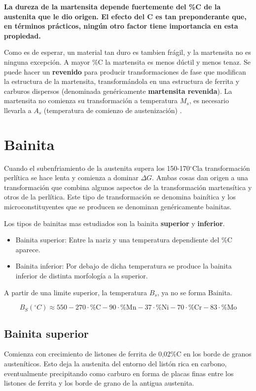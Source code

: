 \documentclass{article}
\newcommand{\grad}{\ensuremath{^\circ \mathrm{C}}}
\begin{document}
\textbf{La dureza de la martensita depende fuertemente del \%C de la austenita que le dio origen. El efecto del C es tan preponderante que, en términos prácticos, ningún otro factor tiene importancia en esta propiedad.}

Como es de esperar, un material tan duro es tambien frágil, y la martensita no es ninguna excepción. A mayor \%C la martensita es menos dúctil y menos tenaz. Se puede hacer un \textbf{revenido} para producir transformaciones de fase que modifican la estructura de la martensita, transformándola en una estructura de ferrita y carburos dispersos (denominada genéricamente \textbf{martensita revenida}). La martensita no comienza su transformación a temperatura $M_s$, es necesario llevarla a $A_s$ (temperatura de comienzo de austenización) \cite{gottstein2013physical}.

\section{Bainita}

Cuando el subenfriamiento de la austenita supera los 150-170\grad la transformación perlítica se hace lenta y comienza a dominar $\Delta G$. Ambas cosas dan origen a una transformación que combina algunos aspectos de la transformación martensítica y otros de la perlítica. Este tipo de transformación se denomina bainítica y los microconstituyentes que se producen se denominan genéricamente bainitas.

Los tipos de bainitas mas estudiados son la bainita \textbf{superior} y \textbf{inferior}.

\begin{itemize}
    \item Bainita superior: Entre la nariz y una temperatura dependiente del \%C aparece.
    \item Bainita inferior: Por debajo de dicha temperatura se produce la bainita inferior de distinta morfología a la superior.
\end{itemize}

A partir de una limite superior, la temperatura $B_s$, ya no se forma Bainita.

\[
B_{S}\left(^{\circ} C\right)\approx550-270 \cdot\%\mathrm{C}-90\cdot\%\mathrm{Mn}-37 \cdot\%\mathrm{Ni}-70 \cdot\%\mathrm{Cr}-83\cdot\%\mathrm{Mo}
\]

\subsection{Bainita superior}
Comienza con crecimiento de listones de ferrita de 0,02\%C en los borde de granos austeníticos. Esto deja la austenita del entorno del listón rica en carbono, eventualmente precipitando como carburo en forma de placas finas entre los listones de ferrita y los borde de grano de la antigua austenita.
\end{document}
